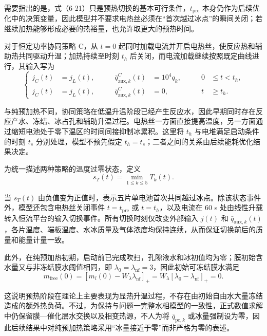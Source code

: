 \documentclass[bwprint]{gmcmthesis}
\numberwithin{figure}{section}
\begin{document}
\noindent 需要指出的是，式（6-21）只是预热切换的基本可行条件，\(t_{\text{pre}}\) 本身仍作为后续优化中的决策变量，因此模型并不要求电热丝必须在“首次越过冰点”的瞬间关闭；若继续加热能够形成必要的热裕量，也允许取更大的预热时间。

\noindent 对于恒定功率协同策略 C，从 \(t = 0\) 起同时加载电流并开启电热丝，使反应热和辅助热共同驱动升温；加热持续至时刻 \(t_h\) 后关闭，而电流加载继续按照既定曲线进行，其输入写为
\begin{equation}
\left\{
\begin{aligned}
j_C(t) &= j_L(t), \qquad & \bar{q}_{\text{aux},k}^C(t) &= 10^4 q_k, \qquad & 0 &\leq t < t_h, \\
j_C(t) &= j_L(t), \qquad & \bar{q}_{\text{aux},k}^C(t) &= 0, \qquad & t &\geq t_h.
\end{aligned}
\right.
\tag{6-22}
\end{equation}

\noindent 与纯预加热不同，协同策略在低温升温阶段已经产生反应水，因此早期同时存在反应产水、冻结、冰占孔和辅助升温过程。电热丝一方面直接提高温度，另一方面通过缩短电池处于零下温区的时间间接抑制冰累积。这里将 \(t_h\) 与电堆满足启动条件的时刻 \(t_s\) 分别处理，模型不预先假定 \(t_h = t_s\)；二者之间的关系由后续能耗优化结果决定。

\noindent 为统一描述两种策略的温度过零状态，定义
\begin{equation}
s_T(t) = \min_{1 \leq k \leq 5} T_k(t). \tag{6-23}
\end{equation}

\noindent 当 \(s_T(t)\) 由负值变为正值时，表示五片单电池首次共同越过冰点。除该状态事件外，模型还包含电热丝关闭事件 \(t = t_{\text{pre}}\) 或 \(t = t_h\)，以及电流在 60 s 处由线性升载转入恒流平台的输入切换事件。所有切换时刻仅改变外部输入 \(j(t)\) 和 \(\bar{q}_{\text{aux},k}(t)\)，各片温度、端板温度、水冰质量及气体浓度均保持连续，从而保证切换前后的质量和能量计量一致。

\noindent 此外，在纯预加热初期，启动前已完成吹扫，孔隙液水和冰初值均为零；膜初始含水量又与非冻结膜水阈值相同，即 \(\lambda_0 = \lambda_{\text{nf}} = 3\)，因此初始可冻结膜水满足
\begin{equation}
m_{\text{free}}(0) = [m_l(0) - W_\lambda \lambda_{\text{nf}}]_+ = W_\lambda [\lambda_0 - \lambda_{\text{nf}}]_+ = 0. \tag{6-24}
\end{equation}

\noindent 这说明预热阶段在理论上主要表现为显热升温过程，不存在由初始自由水大量冻结造成的额外热负荷。不过，为保持与问题一完整水相模型的一致性，正式数值求解中仍保留膜—催化层水交换以及相变热源，不人为将 \(\bar{q}_{\text{pc},k}\) 或冰量强制设为零，因此后续结果中对纯预加热策略采用“冰量接近于零”而非严格为零的表述。
\end{document}
